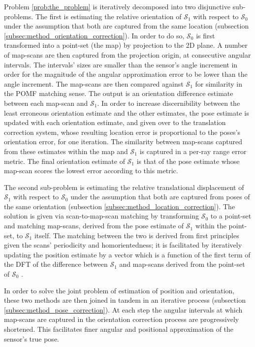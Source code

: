 Problem \ref{prob:the_problem} is iteratively decomposed into two disjunctive
sub-problems. The first is estimating the relative orientation of
$\mathcal{S}_1$ with respect to $\mathcal{S}_0$ under the assumption that both
are captured from the same location (subsection
\ref{subsec:method_orientation_correction}). In order to do so, $\mathcal{S}_0$ is
first transformed into a point-set (the map) by projection to the 2D plane. A
number of map-scans are then captured from the projection origin, at
consecutive angular intervals. The intervals' sizes are smaller than the
sensor's angle increment in order for the magnitude of the angular
approximation error to be lower than the angle increment.  The map-scans are
then compared against $\mathcal{S}_1$ for similarity in the POMF matching
sense. The output is an orientation difference estimate between each map-scan
and $\mathcal{S}_1$. In order to increase discernibility between the least
erroneous orientation estimate and the other estimates, the pose estimate is
updated with each orientation estimate, and given over to the translation
correction system, whose resulting location error is proportional to the
poses's orientation error, for one iteration. The similarity between map-scans
captured from these estimates within the map and $\mathcal{S}_1$ is captured in
a per-ray range error metric. The final orientation estimate of $\mathcal{S}_1$
is that of the pose estimate whose map-scan scores the lowest error according
to this metric.

The second sub-problem is estimating the relative translational displacement of
$\mathcal{S}_1$ with respect to $\mathcal{S}_0$ under the assumption that both
are captured from poses of the same orientation (subsection
\ref{subsec:method_location_correction}). The solution is given via
scan-to-map-scan matching by transforming $\mathcal{S}_0$ to a point-set and
matching map-scans, derived from the pose estimate of $\mathcal{S}_1$ within
the point-set, to $\mathcal{S}_1$ itself. The matching between the two is
derived from first principles given the scans' periodicity and homorientedness;
it is facilitated by iteratively updating the position estimate by a vector
which is a function of the first term of the DFT of the difference between
$\mathcal{S}_1$ and map-scans derived from the point-set of $\mathcal{S}_0$
\cite{icte}.

In order to solve the joint problem of estimation of position and orientation,
these two methods are then joined in tandem in an iterative process (subsection
\ref{subsec:method_pose_correction}). At each step the angular intervals at
which map-scans are captured in the orientation correction process are
progressively shortened. This facilitates finer angular and positional
approximation of the sensor's true pose.

